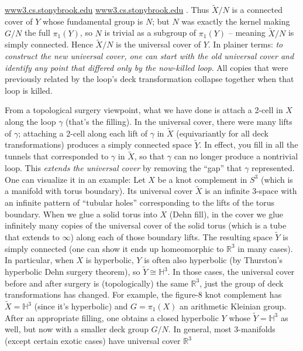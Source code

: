 \documentclass[11pt]{article}
\theoremstyle{remark}
\begin{document}
\href{https://www3.cs.stonybrook.edu/~gu/lectures/2022/Lecture_1/2022_Summer_CCG_Lecture_1.pdf#:~:text=Definition%20,3%2C%202022%2044%20%2F%2059}{www3.cs.stonybrook.edu}
\href{https://www3.cs.stonybrook.edu/~gu/lectures/2022/Lecture_1/2022_Summer_CCG_Lecture_1.pdf#:~:text=The%20quotient%20group%20of%20%CF%801,deck%20transformation%20group%20of%20S%CB%9C}{www3.cs.stonybrook.edu}
. Thus $\widetilde{X}/N$ is a connected cover of $Y$ whose fundamental group is $N$; but $N$ was exactly the kernel making $G/N$ the full $\pi_1(Y)$, so $N$ is trivial as a subgroup of $\pi_1(Y)$ – meaning $\widetilde{X}/N$ is simply connected. Hence $\widetilde{X}/N$ is the universal cover of $Y$. In plainer terms: \textit{to construct the new universal cover, one can start with the old universal cover and identify any point that differed only by the now-killed loop}. All copies that were previously related by the loop’s deck transformation collapse together when that loop is killed.

From a topological surgery viewpoint, what we have done is attach a 2-cell in $X$ along the loop $\gamma$ (that’s the filling). In the universal cover, there were many lifts of $\gamma$; attaching a 2-cell along each lift of $\gamma$ in $\widetilde{X}$ (equivariantly for all deck transformations) produces a simply connected space $\widetilde{Y}$. In effect, you fill in all the tunnels that corresponded to $\gamma$ in $\widetilde{X}$, so that $\gamma$ can no longer produce a nontrivial loop. This \textit{extends the universal cover} by removing the “gap” that $\gamma$ represented. One can visualize it in an example: Let $X$ be a knot complement in $S^3$ (which is a manifold with torus boundary). Its universal cover $\widetilde{X}$ is an infinite 3-space with an infinite pattern of “tubular holes” corresponding to the lifts of the torus boundary. When we glue a solid torus into $X$ (Dehn fill), in the cover we glue infinitely many copies of the universal cover of the solid torus (which is a tube that extends to $\infty$) along each of those boundary lifts. The resulting space $\widetilde{Y}$ is simply connected (one can show it ends up homeomorphic to $\mathbb{R}^3$ in many cases). In particular, when $X$ is hyperbolic, $Y$ is often also hyperbolic (by Thurston’s hyperbolic Dehn surgery theorem), so $\widetilde{Y} \cong \mathbb{H}^3$. In those cases, the universal cover before and after surgery is (topologically) the same $\mathbb{R}^3$, just the group of deck transformations has changed. For example, the figure-8 knot complement has $\widetilde{X} = \mathbb{H}^3$ (since it’s hyperbolic) and $G = \pi_1(X)$ an arithmetic Kleinian group. After an appropriate filling, one obtains a closed hyperbolic $Y$ whose $\widetilde{Y} = \mathbb{H}^3$ as well, but now with a smaller deck group $G/N$. In general, most 3-manifolds (except certain exotic cases) have universal cover $\mathbb{R}^3$
\end{document}

